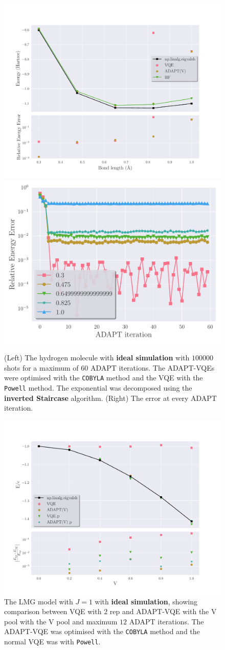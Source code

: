 \begin{figure}[ht]
    \centering
    \includegraphics[width=0.47\linewidth]{image/h2_result/simulation/60iter.pdf}
    \includegraphics[width=0.45\linewidth]{image/h2_result/simulation/60iter_adapt_err.pdf}
    \caption{(Left) The hydrogen molecule with \textbf{ideal simulation} with $ 100000 $ shots for a maximum of $ 60 $ ADAPT iterations. The ADAPT-VQEs were optimised with the \texttt{COBYLA} method and the VQE with the \texttt{Powell} method. The exponential was decomposed using the \textbf{inverted Staircase} algorithm. (Right) The error at every ADAPT iteration.}
    \label{fig:60iterh2}
\end{figure}



\begin{figure}[ht]
\centering
\includegraphics[width=\linewidth]{image/lipkin_result/2repnotok.pdf}
\caption{The LMG model with $ J=1 $ with \textbf{ideal simulation}, showing comparison between VQE with $ 2 $ rep and ADAPT-VQE with the V pool with the V pool and maximum $ 12 $ ADAPT iterations. The ADAPT-VQE was optimised with the \texttt{COBYLA} method and the normal VQE was with \texttt{Powell}. }
\label{fig:2repnotok}
\end{figure}



